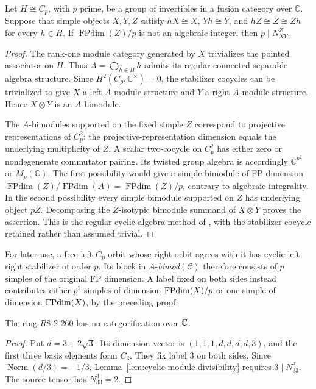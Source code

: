 \begin{lemma}\label{lem:cyclic-module-divisibility}
Let $H\cong C_p$, with $p$ prime, be a group of invertibles in a
fusion category over $\mathbb C$. Suppose that simple objects $X,Y,Z$
satisfy $hX\cong X$, $Yh\cong Y$, and $hZ\cong Z\cong Zh$ for every
$h\in H$. If $\operatorname{FPdim}(Z)/p$ is not an algebraic integer,
then $p\mid N_{XY}^{Z}$.
\end{lemma}
\begin{proof}
The rank-one module category generated by $X$ trivializes the pointed
associator on $H$. Thus $A=\bigoplus_{h\in H}h$ admits its regular
connected separable algebra structure. Since
$H^2(C_p,\mathbb C^\times)=0$, the stabilizer cocycles can be
trivialized to give $X$ a left $A$-module structure and $Y$ a right
$A$-module structure. Hence $X\otimes Y$ is an $A$-bimodule.

The $A$-bimodules supported on the fixed simple $Z$ correspond to
projective representations of $C_p^2$: the projective-representation
dimension equals the underlying multiplicity of $Z$. A scalar
two-cocycle on $C_p^2$ has either zero or nondegenerate commutator
pairing. Its twisted group algebra is accordingly
$\mathbb C^{p^2}$ or $M_p(\mathbb C)$. The first possibility would
give a simple bimodule of FP dimension
$\operatorname{FPdim}(Z)/\operatorname{FPdim}(A)
=\operatorname{FPdim}(Z)/p$, contrary to algebraic integrality.
In the second possibility every simple bimodule supported on $Z$
has underlying object $pZ$. Decomposing the $Z$-isotypic bimodule
summand of $X\otimes Y$ proves the assertion. This is the regular
cyclic-algebra method of \cite[Lemmas~6.1--6.2]{EGODimPQ}, with
the stabilizer cocycle retained rather than assumed trivial.
\end{proof}

For later use, a free left $C_p$ orbit whose right orbit agrees with
it has cyclic left-right stabilizer of order $p$. Its block in
$A$-\emph{bimod}$(\mathcal C)$ therefore consists of $p$ simples
of the original FP dimension. A label fixed on both sides instead
contributes either $p^2$ simples of dimension $\operatorname{FPdim}(X)/p$ or
one simple of dimension $\operatorname{FPdim}(X)$, by the preceding proof.

\begin{proposition}\label{prop:r8-260-morita}
The ring $R8\_2\_260$ has no categorification over $\mathbb C$.
\end{proposition}
\begin{proof}
Put $d=3+2\sqrt3$. Its dimension vector is
$(1,1,1,d,d,d,d,3)$, and the first three basis elements form $C_3$.
They fix label $3$ on both sides. Since
$\operatorname{Norm}(d/3)=-1/3$, Lemma~\ref{lem:cyclic-module-divisibility}
requires $3\mid N_{33}^{3}$. The source tensor has $N_{33}^{3}=2$.
\end{proof}

